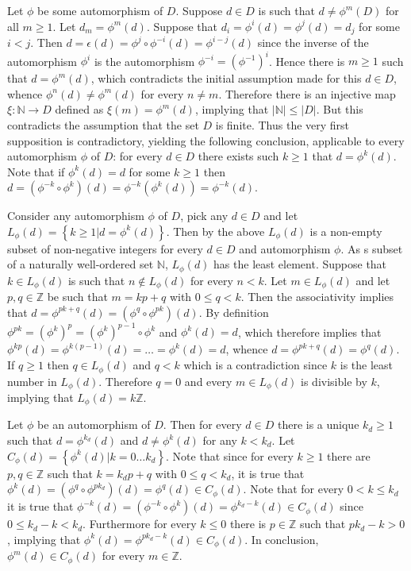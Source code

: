 \documentclass[a4paper]{article}
\newcommand{\obj}[1]{\left\{{#1}\right\}}
\newcommand{\brac}[1]{{\left({#1}\right)}}
\begin{document}
Let $\phi$ be some automorphism of $D$. Suppose $d\in D$ is such that $d\neq \phi^m(D)$ for all $m\geq 1$. Let $d_m = \phi^m(d)$. Suppose that $d_i = \phi^i(d) = \phi^j(d) = d_j$ for some $i<j$. Then $d = \epsilon(d) = \phi^j\circ \phi^{-i}(d) = \phi^{i-j}(d)$ since the inverse of the automorphism $\phi^i$ is the automorphism $\phi^{-i} = \brac{\phi^{-1}}^i$. Hence there is $m\geq 1$ such that $d = \phi^m(d)$, which contradicts the initial	assumption made for this $d\in D$, whence $\phi^n(d)\neq \phi^m(d)$ for every $n\neq m$. Therefore there is an injective map $\xi:\mathbb{N}\to D$ defined as $\xi(m) = \phi^m(d)$, implying that $|\mathbb{N}|\leq |D|$. But this contradicts the assumption that the set $D$ is finite. Thus the very first supposition is contradictory, yielding the following conclusion, applicable to every automorphism $\phi$ of $D$: for every $d\in D$ there exists such $k\geq 1$ that $d=\phi^k(d)$. Note that if $\phi^k(d) = d$ for some $k\geq 1$ then $d = \brac{\phi^{-k}\circ \phi^k}(d) = \phi^{-k}(\phi^k(d)) = \phi^{-k}(d)$.

Consider any automorphism $\phi$ of $D$, pick any $d\in D$ and let $L_\phi(d) = \obj{k\geq 1\vert d=\phi^k(d)}$. Then by the above $L_\phi(d)$ is a non-empty subset of non-negative integers for every $d\in D$ and automorphism $\phi$. As s subset of a naturally well-ordered set $\mathbb{N}$, $L_\phi(d)$ has the least element. Suppose that $k\in L_\phi(d)$ is such that $n\notin L_\phi(d)$ for every $n<k$. Let $m\in L_\phi(d)$ and let $p,q\in \mathbb{Z}$ be such that $m = kp+q$ with $0\leq q < k$. Then the associativity implies that $d = \phi^{pk+q}(d) = \brac{\phi^q\circ\phi^{pk}}(d)$. By definition $\phi^{pk} = \brac{\phi^k}^p = \brac{\phi^k}^{p-1}\circ \phi^k$ and $\phi^k(d) = d$, which therefore implies that $\phi^{kp}(d) = \phi^{k(p-1)}(d) = \ldots = \phi^k(d) = d$, whence $d = \phi^{pk+q}(d) = \phi^q(d)$. If $q\geq 1$ then $q\in L_\phi(d)$ and $q<k$ which is a contradiction since $k$ is the least number in $L_\phi(d)$. Therefore $q=0$ and every $m\in L_\phi(d)$ is divisible by $k$, implying that $L_\phi(d) = k\mathbb{Z}$.

Let $\phi$ be an automorphism of $D$. Then for every $d\in D$ there is a unique $k_d\geq 1$ such that $d=\phi^{k_d}(d)$ and $d\neq \phi^k(d)$ for any $k<k_d$. Let $C_\phi(d) = \obj{\phi^k(d)\vert k=0\ldots k_d}$. Note that since for every $k\geq 1$ there are $p,q\in \mathbb{Z}$ such that $k = k_d p + q$ with $0\leq q < k_d$, it is true that $\phi^k(d) = \brac{\phi^q\circ\phi^{p k_d}}(d) = \phi^q(d)\in C_\phi(d)$. Note that for every $0 < k \leq k_d$ it is true that $\phi^{-k}(d) = \brac{\phi^{-k}\circ \phi^k}(d) = \phi^{k_d-k}(d)\in C_\phi(d)$ since $0\leq k_d-k < k_d$. Furthermore for every $k\leq 0$ there is $p\in \mathbb{Z}$ such that $p k_d - k > 0$, implying that $\phi^k(d) = \phi^{p k_d - k}(d)\in C_\phi(d)$. In conclusion, $\phi^m(d)\in C_\phi(d)$ for every $m\in \mathbb{Z}$. 
\end{document}
